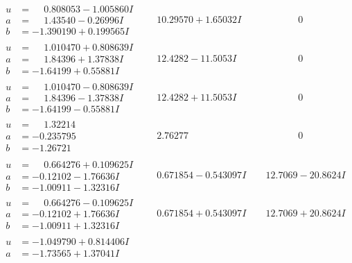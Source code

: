 \documentclass[1p]{elsarticle_modified}
\theoremstyle{definition}
\begin{document}
$$\begin{array}{c|c|c}
 \hline 
\begin{aligned}
u &= \phantom{-}0.808053 - 1.005860 I \\
a &= \phantom{-}1.43540 - 0.26996 I \\
b &= -1.390190 + 0.199565 I\end{aligned}
 & \phantom{-}10.29570 + 1.65032 I & \phantom{-0.000000 } 0 \\ \hline\begin{aligned}
u &= \phantom{-}1.010470 + 0.808639 I \\
a &= \phantom{-}1.84396 + 1.37838 I \\
b &= -1.64199 + 0.55881 I\end{aligned}
 & \phantom{-}12.4282 - 11.5053 I & \phantom{-0.000000 } 0 \\ \hline\begin{aligned}
u &= \phantom{-}1.010470 - 0.808639 I \\
a &= \phantom{-}1.84396 - 1.37838 I \\
b &= -1.64199 - 0.55881 I\end{aligned}
 & \phantom{-}12.4282 + 11.5053 I & \phantom{-0.000000 } 0 \\ \hline\begin{aligned}
u &= \phantom{-}1.32214\phantom{ +0.000000I} \\
a &= -0.235795\phantom{ +0.000000I} \\
b &= -1.26721\phantom{ +0.000000I}\end{aligned}
 & \phantom{-}2.76277\phantom{ +0.000000I} & \phantom{-0.000000 } 0 \\ \hline\begin{aligned}
u &= \phantom{-}0.664276 + 0.109625 I \\
a &= -0.12102 - 1.76636 I \\
b &= -1.00911 - 1.32316 I\end{aligned}
 & \phantom{-}0.671854 - 0.543097 I & \phantom{-}12.7069 - 20.8624 I \\ \hline\begin{aligned}
u &= \phantom{-}0.664276 - 0.109625 I \\
a &= -0.12102 + 1.76636 I \\
b &= -1.00911 + 1.32316 I\end{aligned}
 & \phantom{-}0.671854 + 0.543097 I & \phantom{-}12.7069 + 20.8624 I \\ \hline\begin{aligned}
u &= -1.049790 + 0.814406 I \\
a &= -1.73565 + 1.37041 I \\

\end{aligned}
\end{array}$$
\end{document}

